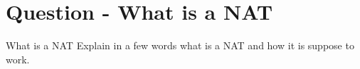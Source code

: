 \section{Question - What is a NAT}

\begin{questionBox}{What is a NAT}
    Explain in a few words what is a NAT and how it is suppose to work.
\end{questionBox}
